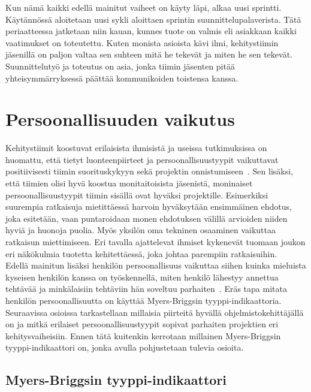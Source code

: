 \documentclass[finnish]{../tktltiki2}
\theoremstyle{definition}
\theoremstyle{remark}
\begin{document}
Kun nämä kaikki edellä mainitut vaiheet on käyty läpi, alkaa uusi
sprintti. Käytännössä aloitetaan uusi sykli aloittaen
sprintin suunnittelupalaverista. Tätä periaatteessa jatketaan
niin kauan, kunnes tuote on valmis eli asiakkaan kaikki vaatimukset
on toteutettu. Kuten monista asioista kävi ilmi, kehitystiimin jäsenillä on paljon valtaa sen suhteen mitä he tekevät ja miten he
sen tekevät. Suunnittelutyö ja toteutus on asia, jonka tiimin
jäsenten pitää yhteisymmärryksessä päättää kommunikoiden toistensa kanssa.

\section{Persoonallisuuden vaikutus}

Kehitystiimit koostuvat erilaisista ihmisistä ja useissa tutkimuksissa on huomattu, että tietyt
luonteenpiirteet ja persoonallisuustyypit vaikuttavat positiivisesti tiimin suorituskykyyn sekä
projektin onnistumiseen~\cite{Acuna:2008:ESP:1414004.1414056,Gorla:2004:WWB:990680.990684,Capretz:2003:PTS:766407.766410,Capretz:2010:MSS:1726559.1726574}. Sen lisäksi, että tiimien olisi hyvä koostua monitaitoisista
jäsenistä, moninaiset persoonallisuustyypit tiimin sisällä ovat hyväksi
projektille. Esimerkiksi suurempia ratkaisuja mietittäessä harvoin hyväksytään
ensimmäinen ehdotus, joka esitetään, vaan puntaroidaan monen ehdotuksen
välillä arvioiden niiden hyviä ja huonoja puolia. Myös yksilön oma
tekninen osaaminen vaikuttaa ratkaisun miettimiseen. Eri tavalla ajattelevat ihmiset kykenevät tuomaan joukon
eri näkökulmia tuotetta kehitettäessä, joka johtaa parempiin ratkaisuihin.\\

Edellä mainitun lisäksi henkilön persoonallisuus vaikuttaa
siihen
kuinka mieluista kyseisen henkilön kanssa on työskennellä,
miten henkilö lähestyy annettua tehtävää ja minkälaisiin tehtäviin
hän soveltuu parhaiten~\cite{Begel:2008:PPW:1414004.1414026,Capretz:2010:MSS:1726559.1726574}. Eräs tapa mitata henkilön persoonallisuutta on käyttää Myers-Briggsin tyyppi-indikaattoria.
Seuraavissa osioissa tarkastellaan millaisia piirteitä hyvällä
ohjelmistokehittäjällä on ja mitkä erilaiset persoonallisuustyypit
sopivat parhaiten projektien eri kehitysvaiheisiin. Ennen tätä kuitenkin kerrotaan millainen Myers-Briggsin tyyppi-indikaattori on, jonka avulla pohjustetaan tulevia osioita.

\subsection{Myers-Briggsin tyyppi-indikaattori}
\end{document}
